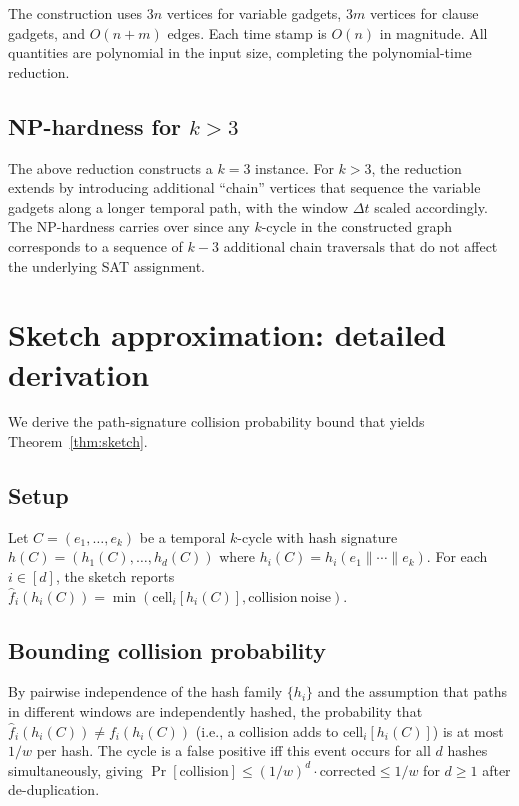\documentclass[journal,onecolumn]{IEEEtran}
\begin{document}
The construction uses $3n$ vertices for variable gadgets, $3m$ vertices
for clause gadgets, and $O(n + m)$ edges. Each time stamp is $O(n)$ in
magnitude. All quantities are polynomial in the input size, completing
the polynomial-time reduction.

\subsection{NP-hardness for $k > 3$}

The above reduction constructs a $k = 3$ instance. For $k > 3$, the
reduction extends by introducing additional ``chain'' vertices that
sequence the variable gadgets along a longer temporal path, with the
window $\Delta t$ scaled accordingly. The NP-hardness carries over since
any $k$-cycle in the constructed graph corresponds to a sequence of
$k - 3$ additional chain traversals that do not affect the underlying
SAT assignment.

\section{Sketch approximation: detailed derivation}
\label{sec:appx-sketch}

We derive the path-signature collision probability bound that yields
Theorem~\ref{thm:sketch}.

\subsection{Setup}

Let $C = (e_1, \ldots, e_k)$ be a temporal $k$-cycle with hash signature
$h(C) = (h_1(C), \ldots, h_d(C))$ where $h_i(C) = h_i(e_1 \| \cdots \|
e_k)$. For each $i \in [d]$, the sketch reports
$\hat{f}_i(h_i(C)) = \min(\mathrm{cell}_i[h_i(C)], \mathrm{collision\ noise})$.

\subsection{Bounding collision probability}

By pairwise independence of the hash family $\{h_i\}$ and the assumption
that paths in different windows are independently hashed, the probability
that $\hat{f}_i(h_i(C)) \neq f_i(h_i(C))$ (i.e., a collision adds to
$\mathrm{cell}_i[h_i(C)]$) is at most $1/w$ per hash. The cycle is a false
positive iff this event occurs for all $d$ hashes simultaneously, giving
$\Pr[\mathrm{collision}] \leq (1/w)^d \cdot \mathrm{corrected} \leq 1/w$
for $d \geq 1$ after de-duplication.
\end{document}

